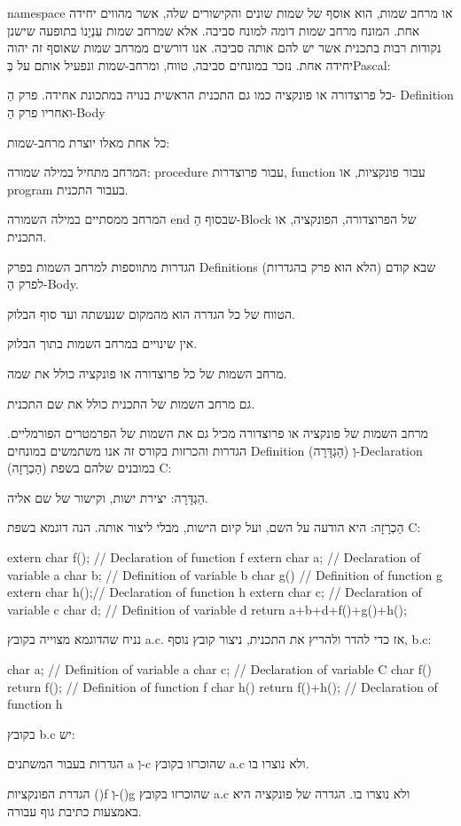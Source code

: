       \begin{ציינון}
\item namespace או מרחב שמות, הוא אוסף של שמות
      שונים והקישורים שלה, אשר מהווים יחידה אחת.
      המונח מרחב שמות דומה למונח סביבה. אלא שמרחב
      שמות עִנְיָנוֹ בתופעה שישנן נקודות רבות בתכנית אשר
      יש להם אותה סביבה. אנו דורשים ממרחב שמות שאוסף
      זה יהוה יחידה אחת.
      נזכר במונחים סביבה, טווח, ומרחב-שמות ונפעיל אותם על בְּPascal:
\item כל פרוצדורה או פונקציה כמו גם התכנית הראשית בנויה במתכונת אחידה. פרק הַ- Definition ואחריו פרק הַ-Body
\item כל אחת מאלו יוצרת מרחב-שמות:
\item המרחב מתחיל במילה שמורה: procedure עבור פרוצדרות, function עבור פונקציות, או program בעבור התכנית.
\item המרחב ממסתיים במילה השמורה end שבסוף הַ-Block של הפרוצדורה, הפונקציה, או התכנית.
\item הגדרות מתווספות למרחב השמות בפרק Definitions (הלא הוא פרק בהגדרות) שבא קודם לפרק הַ-Body.
\item הטווח של כל הגדרה הוא מהמקום שנעשתה ועד סוף הבלוק.
\item אין שינויים במרחב השמות בתוך הבלוק.
\item מרחב השמות של כל פרוצדורה או פונקציה כולל את שמה.
\item גם מרחב השמות של התכנית כולל את שם התכנית.
\item מרחב השמות של פונקציה או פרוצדורה מכיל גם את השמות של הפרמטרים הפורמליים.
      הגדרות והכרזות
      בקורס זה אנו משתמשים במונחים Definition (הַגְדָּרָה) וְ-Declaration (הַכְרָזָה) במובנים שלהם בשפת C:
\item הַגְדָּרָה: יצירת ישות, וקישור של שם אליה.
\item הַכְרָזָה: היא הודעה על השם, ועל קיום הישות, מבלי ליצור אותה.
      הנה דוגמא בשפת C:
  \end{ציינון}
\begin{CPP}
extern char f(); // Declaration of function f
extern char a; // Declaration of variable a
char b; // Definition of variable b
char g() { // Definition of function g
  extern char h();// Declaration of function h
  extern char c; // Declaration of variable c
  char d; // Definition of variable d
  return a+b+d+f()+g()+h();
}
\end{CPP}
      נניח שהדוגמא מצוייה בקובץ a.c. אז כדי להדר ולהריץ את התכנית, ניצור קובץ נוסף, b.c:

\begin{CPP}
char a; // Definition of variable a
char c; // Declaration of variable C
char f() { return f(); } // Definition of function f
char h() { return f()+h(); } // Declaration of function h
\end{CPP}
      בקובץ b.c יש:
      \begin{ציינון}
\item הגדרות בעבור המשתנים a וְ-c שהוכרזו בקובץ a.c ולא נוצרו בו.
\item הגדרת הפונקציות ()f וְ-()g שהוכרזו בקובץ a.c ולא נוצרו בו. הגדרה של פונקציה היא באמצעות כתיבת גוף עבורה.
    \end{ציינון}


